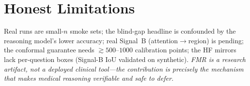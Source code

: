 \documentclass[11pt]{article}
\begin{document}
\section{Honest Limitations}
Real runs are small-$n$ smoke sets; the blind-gap headline is confounded by the reasoning
model's lower accuracy; real Signal~B (attention$\to$region) is pending; the conformal
guarantee needs $\gtrsim\!500$--$1000$ calibration points; the HF mirrors lack per-question
boxes (Signal-B IoU validated on synthetic). \emph{FMR is a research artifact, not a deployed
clinical tool---the contribution is precisely the mechanism that makes medical reasoning
verifiable and safe to defer.}
\end{document}
